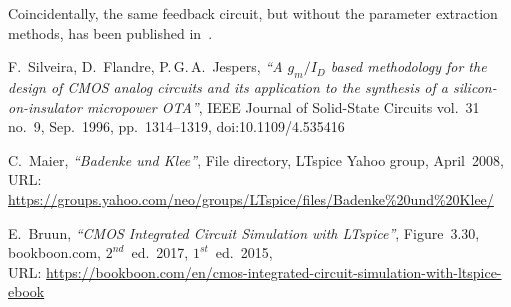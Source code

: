 \documentclass[journal]{IEEEtran}
\begin{document}
Coincidentally, the same feedback circuit, but without the parameter extraction methods, 
has been published in~\cite{Bruun2017}.

\begin{thebibliography}{1}
F.~Silveira, D.~Flandre, P.\,G.\,A.~Jespers,
\textsl{``A $g_m/I_D$ based methodology for the design of CMOS analog circuits and its application to the synthesis of a silicon-on-insulator micropower OTA''},
IEEE Journal of Solid-State Circuits vol.~31 no.~9, Sep.~1996, pp.~1314--1319,
doi:10.1109/4.535416

C.~Maier, \textsl{``Badenke und Klee''}, File directory, LTspice Yahoo group, April~2008,\\
URL: \url{https://groups.yahoo.com/neo/groups/LTspice/files/Badenke\%20und\%20Klee/}

E.~Bruun, \textsl{``CMOS Integrated Circuit Simulation with LTspice''}, Figure~3.30, 
bookboon.com, $2^{nd}$~ed.~2017, $1^{st}$~ed.~2015,\\
URL: \url{https://bookboon.com/en/cmos-integrated-circuit-simulation-with-ltspice-ebook}
\end{thebibliography}
\end{document}
